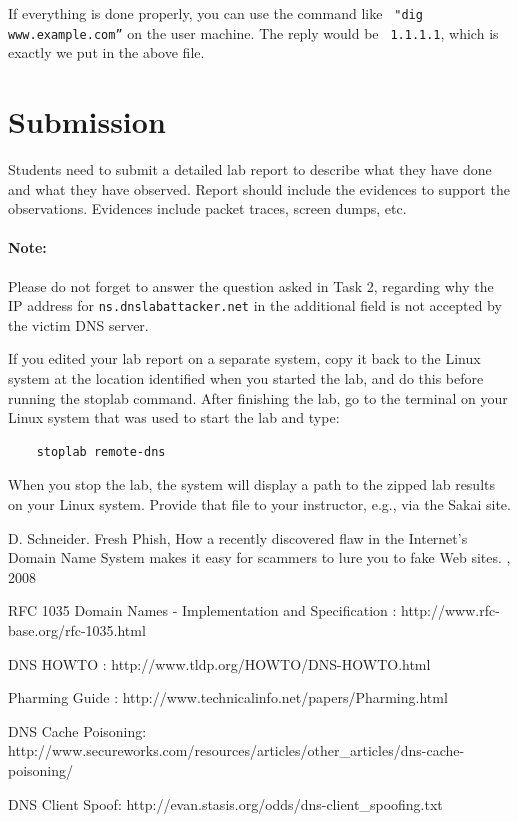 If everything is done properly, you can use the command like {\tt
"dig www.example.com”} on the user machine. The reply would be {\tt
1.1.1.1}, which is exactly we put in the above file. 



\section{Submission}

Students need to submit a detailed lab report to describe what they have done and
what they have observed. Report should include the evidences to support 
the observations. Evidences include packet traces, screen dumps, etc.

\paragraph{Note:} Please do not forget to answer the question asked in
Task 2, regarding why the IP address for 
{\tt ns.dnslabattacker.net} in the additional field is not
accepted by the victim DNS server. 

If you edited your lab report on a separate system, copy it back to the Linux system at the location
identified when you started the lab, and do this before running the stoplab command.
After finishing the lab, go to the terminal on your Linux system that was used to start the lab and type:
\begin{verbatim}
    stoplab remote-dns
\end{verbatim}
When you stop the lab, the system will display a path to the zipped lab results on your Linux system.  Provide that file to
your instructor, e.g., via the Sakai site.


\begin{thebibliography}{10}

\newblock D. Schneider.
\newblock Fresh Phish, How a recently discovered flaw in the Internet's Domain Name
System makes it easy for scammers to lure you to fake Web sites.
, 2008  

RFC 1035 Domain Names - Implementation and Specification :
\newblock http://www.rfc-base.org/rfc-1035.html

DNS HOWTO :
\newblock http://www.tldp.org/HOWTO/DNS-HOWTO.html

Pharming Guide :
\newblock http://www.technicalinfo.net/papers/Pharming.html

DNS Cache Poisoning:
\newblock http://www.secureworks.com/resources/articles/other\_articles/dns-cache-poisoning/

DNS Client Spoof:
\newblock http://evan.stasis.org/odds/dns-client\_spoofing.txt


\end{thebibliography}


